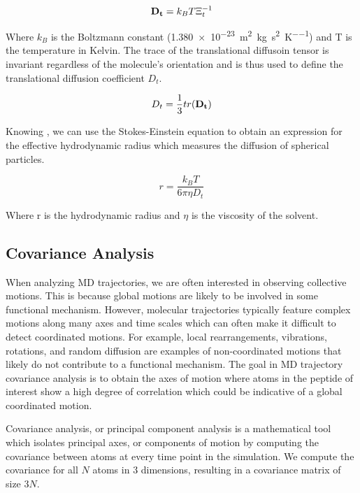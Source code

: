 \begin{equation}
\mathbf{D_{t}} = k_BT\Xi_{t}^{-1}
\end{equation}

Where $k_B$ is the Boltzmann constant (\SI{1.380e-23}{\square\metre\kilo\gram\per\square\second\per\kelvin}) and T is the temperature in Kelvin. The trace of the translational diffusoin tensor is invariant regardless of the molecule's orientation and is thus used to define the translational diffusion coefficient $D_t$.

\begin{equation}
D_t = \frac{1}{3}tr(\mathbf{D_t})
\end{equation}

Knowing \diffusion, we can use the Stokes-Einstein equation to obtain an expression for the effective hydrodynamic radius which measures the diffusion of spherical particles.

\begin{equation}
r = \frac{k_{B}T}{6\pi \eta D_{t}}
\end{equation}

Where r is the hydrodynamic radius and $\eta$ is the viscosity of the solvent.

\subsection{Covariance Analysis}

When analyzing MD trajectories, we are often interested in observing collective motions. This is because global motions are likely to be involved in some functional mechanism. However, molecular trajectories typically feature complex motions along many axes and time scales which can often make it difficult to detect coordinated motions. For example, local rearrangements, vibrations, rotations, and random diffusion are examples of non-coordinated motions that likely do not contribute to a functional mechanism. The goal in MD trajectory covariance analysis is to obtain the axes of motion where atoms in the peptide of interest show a high degree of correlation which could be indicative of a global coordinated motion. 

Covariance analysis, or principal component analysis is a mathematical tool which isolates principal axes, or components of motion by computing the covariance between atoms at every time point in the simulation. We compute the covariance for all $N$ atoms in $3$ dimensions, resulting in a covariance matrix of size $3N$.

